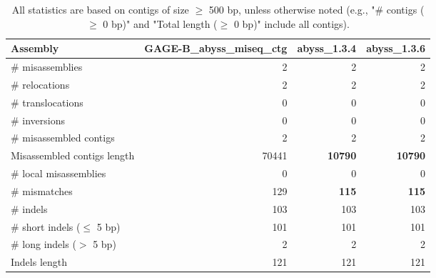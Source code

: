 \documentclass[12pt,a4paper]{article}
\begin{document}
\begin{table}[ht]
\begin{center}
\caption{All statistics are based on contigs of size $\geq$ 500 bp, unless otherwise noted (e.g., "\# contigs ($\geq$ 0 bp)" and "Total length ($\geq$ 0 bp)" include all contigs).}
\begin{tabular}{|l*{3}{|r}|}
\hline
Assembly & GAGE-B\_abyss\_miseq\_ctg & abyss\_1.3.4 & abyss\_1.3.6 \\ \hline
\# misassemblies & 2 & 2 & 2 \\ \hline
\hspace{5mm}\# relocations & 2 & 2 & 2 \\ \hline
\hspace{5mm}\# translocations & 0 & 0 & 0 \\ \hline
\hspace{5mm}\# inversions & 0 & 0 & 0 \\ \hline
\# misassembled contigs & 2 & 2 & 2 \\ \hline
Misassembled contigs length & 70441 & {\bf 10790} & {\bf 10790} \\ \hline
\# local misassemblies & 0 & 0 & 0 \\ \hline
\# mismatches & 129 & {\bf 115} & {\bf 115} \\ \hline
\# indels & 103 & 103 & 103 \\ \hline
\hspace{5mm}\# short indels ($\leq$ 5 bp) & 101 & 101 & 101 \\ \hline
\hspace{5mm}\# long indels ($>$ 5 bp) & 2 & 2 & 2 \\ \hline
Indels length & 121 & 121 & 121 \\ \hline
\end{tabular}
\end{center}
\end{table}
\end{document}
